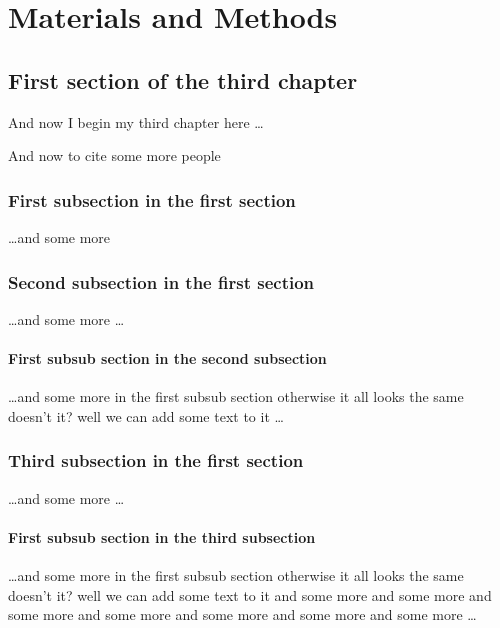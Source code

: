 \chapter{Materials and Methods}
\label{chapter3}
\ifpdf
    \graphicspath{{Chapter3/Figs/Raster/}{Chapter3/Figs/PDF/}{Chapter3/Figs/}}
\else
    \graphicspath{{Chapter3/Figs/Vector/}{Chapter3/Figs/}}
\fi

\section{First section of the third chapter}
And now I begin my third chapter here \dots

And now to cite some more people~\cite{Rea85,Ancey1996}

\subsection{First subsection in the first section}
\dots and some more 

\subsection{Second subsection in the first section}
\dots and some more \dots

\subsubsection{First subsub section in the second subsection}
\dots and some more in the first subsub section otherwise it all looks the same
doesn't it? well we can add some text to it \dots

\subsection{Third subsection in the first section}
\dots and some more \dots

\subsubsection{First subsub section in the third subsection}
\dots and some more in the first subsub section otherwise it all looks the same
doesn't it? well we can add some text to it and some more and some more and
some more and some more and some more and some more and some more \dots

